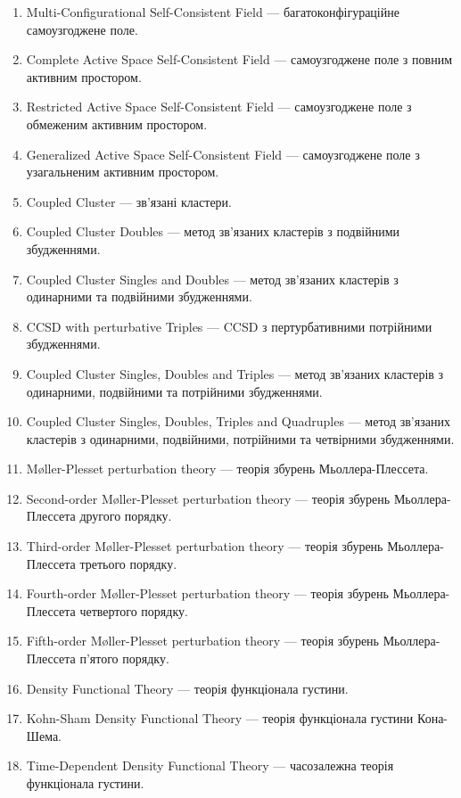 \begin{enumerate}[
    leftmargin=10em,
    font=\bfseries,   %
    labelindent=5em,%
    leftmargin=*,     %
]
    \item[MCSCF] Multi-Configurational Self-Consistent Field --- багатоконфігураційне самоузгоджене поле.
    \item[CASSCF] Complete Active Space Self-Consistent Field --- самоузгоджене поле з повним активним простором.
    \item[RASSCF] Restricted Active Space Self-Consistent Field --- самоузгоджене поле з обмеженим активним простором.
    \item[GASSCF] Generalized Active Space Self-Consistent Field --- самоузгоджене поле з узагальненим активним простором.

    \item[CC] Coupled Cluster --- зв'язані кластери.
    \item[CCD] Coupled Cluster Doubles --- метод зв'язаних кластерів з подвійними збудженнями.
    \item[CCSD] Coupled Cluster Singles and Doubles --- метод зв'язаних кластерів з одинарними та подвійними збудженнями.
    \item[CCSD(T)] CCSD with perturbative Triples --- CCSD з пертурбативними потрійними збудженнями.
    \item[CCSDT] Coupled Cluster Singles, Doubles and Triples --- метод зв'язаних кластерів з одинарними, подвійними та потрійними збудженнями.
    \item[CCSDTQ] Coupled Cluster Singles, Doubles, Triples and Quadruples --- метод зв'язаних кластерів з одинарними, подвійними, потрійними та четвірними збудженнями.

    \item[MP] Møller-Plesset perturbation theory --- теорія збурень Мьоллера-Плессета.
    \item[MP2] Second-order Møller-Plesset perturbation theory --- теорія збурень Мьоллера-Плессета другого порядку.
    \item[MP3] Third-order Møller-Plesset perturbation theory --- теорія збурень Мьоллера-Плессета третього порядку.
    \item[MP4] Fourth-order Møller-Plesset perturbation theory --- теорія збурень Мьоллера-Плессета четвертого порядку.
    \item[MP5] Fifth-order Møller-Plesset perturbation theory --- теорія збурень Мьоллера-Плессета п'ятого порядку.

    \item[DFT] Density Functional Theory --- теорія функціонала густини.
    \item[KS-DFT] Kohn-Sham Density Functional Theory --- теорія функціонала густини Кона-Шема.
    \item[TDDFT] Time-Dependent Density Functional Theory --- часозалежна теорія функціонала густини.


\end{enumerate}

